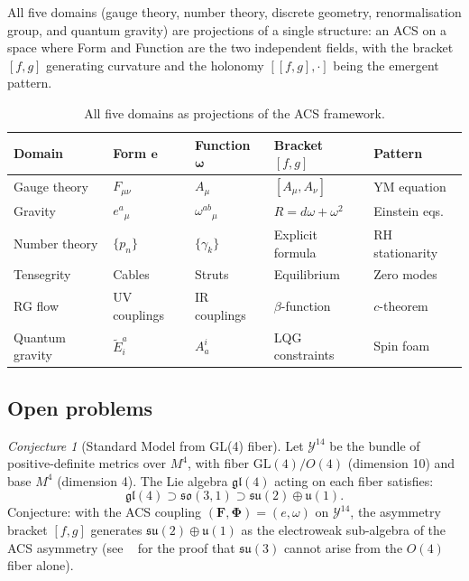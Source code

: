 \documentclass[11pt,a4paper]{article}
\theoremstyle{plain}
\theoremstyle{definition}
\theoremstyle{remark}
\newtheorem{conjecture}[theorem]{Conjecture}
\newcommand{\FormF}{\mathbf{F}}
\newcommand{\FuncF}{\boldsymbol{\Phi}}
\renewcommand{\Form}{\mathbf{e}}
\providecommand{\Func}{\boldsymbol{\omega}}
\begin{document}
All five domains (gauge theory, number theory, discrete geometry, renormalisation group, and quantum gravity) are projections of a single structure: an ACS on a space where 
Form and Function are the two independent fields, with the bracket 
$[f, g]$ generating curvature and the holonomy $[[f,g],\cdot]$ 
being the emergent pattern.

\begin{table}[h]
\centering
\begin{tabular}{lllll}
\toprule
Domain & Form $\Form$ & Function $\Func$ & Bracket $[f,g]$ & Pattern \\
\midrule
Gauge theory & $F_{\mu\nu}$ & $A_\mu$ & $[A_\mu, A_\nu]$ & YM equation \\
Gravity & $e^a{}_\mu$ & $\omega^{ab}{}_\mu$ & $R = d\omega + \omega^2$ & Einstein eqs.\ \\
Number theory & $\{p_n\}$ & $\{\gamma_k\}$ & Explicit formula & RH stationarity \\
Tensegrity & Cables & Struts & Equilibrium & Zero modes \\
RG flow & UV couplings & IR couplings & $\beta$-function & $c$-theorem \\
Quantum gravity & $\tilde{E}^a_i$ & $A^i_a$ & LQG constraints & Spin foam \\
\bottomrule
\end{tabular}
\caption{All five domains as projections of the ACS framework.}
\end{table}

\subsection{Open problems}

\begin{conjecture}[Standard Model from GL(4) fiber]\label{conj:SM}
Let $\mathcal{Y}^{14}$ be the bundle of positive-definite metrics over $M^4$, 
with fiber $\mathrm{GL}(4)/O(4)$ (dimension 10) and base $M^4$ (dimension 4).  
The Lie algebra $\mathfrak{gl}(4)$ acting on each fiber satisfies:
\[
  \mathfrak{gl}(4) \supset \mathfrak{so}(3,1) \supset 
  \mathfrak{su}(2) \oplus \mathfrak{u}(1).
\]
Conjecture: with the ACS coupling $(\FormF, \FuncF) = (e, \omega)$ on 
$\mathcal{Y}^{14}$, the asymmetry bracket $[f, g]$ generates 
$\mathfrak{su}(2) \oplus \mathfrak{u}(1)$ 
as the electroweak sub-algebra of the ACS asymmetry 
(see ~\cite{Wallace2026a} for the proof that $\mathfrak{su}(3)$ 
cannot arise from the $O(4)$ fiber alone).
\end{conjecture}
\end{document}
